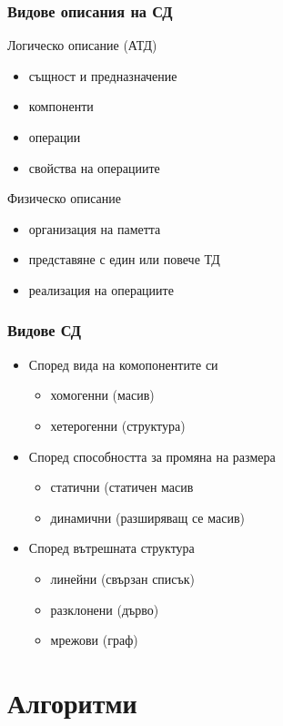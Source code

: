 \documentclass{beamer}
\begin{document}
\begin{frame}
  \frametitle{Видове описания на СД}

  Логическо описание (АТД)
  \begin{itemize}
  \item същност и предназначение
  \item компоненти
  \item операции
  \item свойства на операциите
  \end{itemize}
  \vspace{1em}

  Физическо описание
  \begin{itemize}
  \item организация на паметта
  \item представяне с един или повече ТД
  \item реализация на операциите
  \end{itemize}
\end{frame}

\begin{frame}
  \frametitle{Видове СД}

  \begin{itemize}
  \item Според вида на комопонентите си
    \begin{itemize}
    \item хомогенни (масив)
    \item хетерогенни (структура)
    \end{itemize}
  \item Според способността за промяна на размера
    \begin{itemize}
    \item статични (статичен масив
    \item динамични (разширяващ се масив)
    \end{itemize}
  \item Според вътрешната структура
    \begin{itemize}
    \item линейни (свързан списък)
    \item разклонени (дърво)
    \item мрежови (граф)
    \end{itemize}
  \end{itemize}
\end{frame}

\section{Алгоритми}
\end{document}
